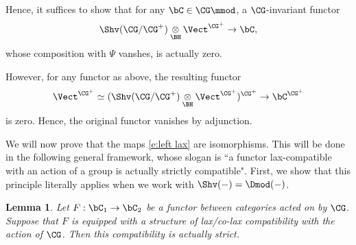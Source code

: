 \documentclass[9pt]{amsart}
\newtheorem{lem}[subsubsection]{Lemma}
\theoremstyle{definition}
\theoremstyle{remark}
\numberwithin{equation}{section}
\begin{document}
Hence, it suffices to show that for any $\bC\in \CG\mmod$, a $\CG$-invariant functor
$$\Shv(\CG/\CG^+)\underset{\BH}\otimes \Vect^{\CG^+}\to \bC,$$
whose composition with $\Psi$ vanshes, is actually zero. 

\medskip

However, for any functor as above, the resulting functor
$$\Vect^{\CG^+}\simeq (\Shv(\CG/\CG^+)\underset{\BH}\otimes \Vect^{\CG^+})^{\CG^+}\to \bC^{\CG^+}$$
is zero. Hence, the original functor vanishes by adjunction. 

\sssec{}

We will now prove that the maps \eqref{e:left lax} are isomorphisms. This will be done 
in the following general framework, whose slogan is ``a functor lax-compatible with an action of a group is actually
strictly compatible".  First, we show that this principle literally applies when we work with $\Shv(-)=\Dmod(-)$. 

\begin{lem} \label{l:adj inv}
Let $F:\bC_1\to \bC_2$ be a functor between categories acted on by $\CG$. Suppose that $F$ is equipped with a structure
of lax/co-lax compatibility with the action of $\CG$. Then this compatibility is actually strict.
\end{lem}
\end{document}

